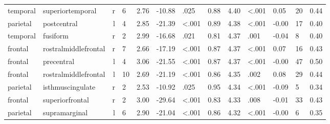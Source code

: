 \documentclass{article}
\begin{document}
\begin{longtable}{llrR{1.3cm}R{1cm}R{1.3cm}R{1cm}R{1cm}R{1.3cm}R{1cm}R{1.8cm}R{1.3cm}R{1.8cm}}
  temporal &          superiortemporal &    r &         6 &                  2.76 &           -10.88 &               .025 &                               0.88 &                          4.40 &                   \textless.001 &   0.05 &     20 &      0.44 \\
  parietal &               postcentral &    l &         4 &                  2.85 &           -21.39 &      \textless.001 &                               0.89 &                          4.38 &                   \textless.001 &  -0.00 &     17 &      0.40 \\
  temporal &                  fusiform &    r &         2 &                  2.99 &           -16.68 &               .021 &                               0.81 &                          4.37 &                            .001 &  -0.04 &      8 &      0.40 \\
   frontal &      rostralmiddlefrontal &    r &         7 &                  2.66 &           -17.19 &      \textless.001 &                               0.87 &                          4.37 &                   \textless.001 &   0.07 &     16 &      0.43 \\
   frontal &                precentral &    l &         4 &                  3.06 &           -21.55 &      \textless.001 &                               0.87 &                          4.37 &                   \textless.001 &  -0.00 &     47 &      0.50 \\
   frontal &      rostralmiddlefrontal &    l &        10 &                  2.69 &           -21.19 &      \textless.001 &                               0.86 &                          4.35 &                            .002 &   0.08 &     29 &      0.44 \\
  parietal &          isthmuscingulate &    r &         2 &                  2.53 &           -10.92 &               .025 &                               0.95 &                          4.34 &                   \textless.001 &  -0.09 &      5 &      0.34 \\
   frontal &           superiorfrontal &    r &         2 &                  3.00 &           -29.64 &      \textless.001 &                               0.83 &                          4.33 &                            .008 &  -0.01 &     33 &      0.43 \\
  parietal &             supramarginal &    l &         6 &                  2.90 &           -21.04 &      \textless.001 &                               0.86 &                          4.32 &                   \textless.001 &  -0.00 &      6 &      0.35 \\

\end{longtable}
\end{document}
